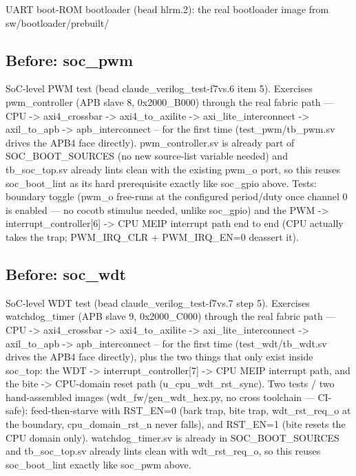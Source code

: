 \begin{record}
\begin{textblock}
UART boot-ROM bootloader (bead hlrm.2): the real bootloader image from sw/bootloader/prebuilt/
\end{textblock}

\subsection*{Before: soc\_pwm}

\begin{textblock}
SoC-level PWM test (bead claude_verilog_test-f7vs.6 item 5). Exercises
pwm_controller (APB slave 8, 0x2000_B000) through the real fabric path —
CPU -> axi4_crossbar -> axi4_to_axilite -> axi_lite_interconnect ->
axil_to_apb -> apb_interconnect -- for the first time (test_pwm/tb_pwm.sv
drives the APB4 face directly). pwm_controller.sv is already part of
SOC_BOOT_SOURCES (no new source-list variable needed) and tb_soc_top.sv
already lints clean with the existing pwm_o port, so this reuses
soc_boot_lint as its hard prerequisite exactly like soc_gpio above.
Tests: boundary toggle (pwm_o free-runs at the configured period/duty once
channel 0 is enabled — no cocotb stimulus needed, unlike soc_gpio) and the
PWM -> interrupt_controller[6] -> CPU MEIP interrupt path end to end (CPU
actually takes the trap; PWM_IRQ_CLR + PWM_IRQ_EN=0 deassert it).
\end{textblock}

\subsection*{Before: soc\_wdt}

\begin{textblock}
SoC-level WDT test (bead claude_verilog_test-f7vs.7 step 5). Exercises watchdog_timer
(APB slave 9, 0x2000_C000) through the real fabric path — CPU -> axi4_crossbar ->
axi4_to_axilite -> axi_lite_interconnect -> axil_to_apb -> apb_interconnect -- for the first
time (test_wdt/tb_wdt.sv drives the APB4 face directly), plus the two things that only exist
inside soc_top: the WDT -> interrupt_controller[7] -> CPU MEIP interrupt path, and the
bite -> CPU-domain reset path (u_cpu_wdt_rst_sync). Two tests / two hand-assembled images
(wdt_fw/gen_wdt_hex.py, no cross toolchain — CI-safe): feed-then-starve with RST_EN=0 (bark
trap, bite trap, wdt_rst_req_o at the boundary, cpu_domain_rst_n never falls), and RST_EN=1
(bite resets the CPU domain only). watchdog_timer.sv is already in SOC_BOOT_SOURCES and
tb_soc_top.sv already lints clean with wdt_rst_req_o, so this reuses soc_boot_lint exactly
like soc_pwm above.
\end{textblock}


\end{record}
